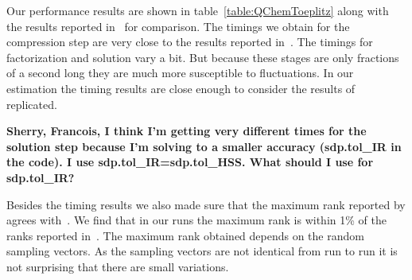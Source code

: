 \documentclass{acmsmall}
\newcommand{\dmcomment}[1]{\textbf{#1}}
\begin{document}
Our performance results are shown in
table~\ref{table:QChemToeplitz} along with the results reported
in~\cite{rouet:strumpack} for comparison.  The timings we obtain
for the compression step are very close to the results reported
in~\cite{rouet:strumpack}.  The timings for factorization and
solution vary a bit.  But because these stages are only fractions
of a second long they are much more susceptible to fluctuations.
In our estimation the timing results are close enough to consider
the results of~\cite{rouet:strumpack} replicated.
\begin{table}
\label{table:QChemToeplitz}
\end{table}
\dmcomment{Sherry, Francois, I think I'm getting very different
  times for the solution step because I'm solving to a smaller
  accuracy (sdp.tol\_IR in the code).  I use
  sdp.tol\_IR=sdp.tol\_HSS.  What should I use for sdp.tol\_IR?}

Besides the timing results we also made sure that the maximum
rank reported by \strumpack{} agrees with~\cite{rouet:strumpack}.
We find that in our runs the maximum rank is within 1\% of the
ranks reported in~\cite{rouet:strumpack}.  The maximum rank
obtained depends on the random sampling vectors.  As the sampling
vectors are not identical from run to run it is not surprising
that there are small variations.
\end{document}
